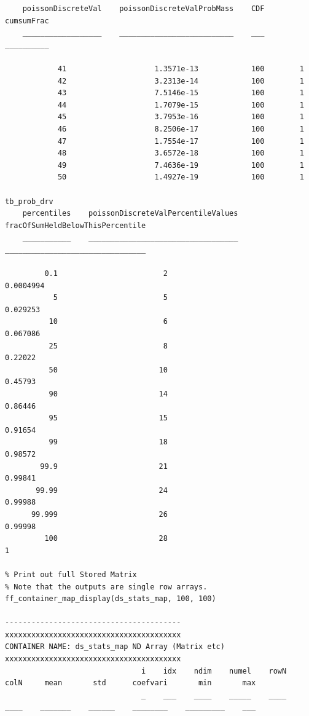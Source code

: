 \documentclass[
]{book}
\begin{document}
\begin{verbatim}
    poissonDiscreteVal    poissonDiscreteValProbMass    CDF    cumsumFrac
    __________________    __________________________    ___    __________

            41                    1.3571e-13            100        1     
            42                    3.2313e-14            100        1     
            43                    7.5146e-15            100        1     
            44                    1.7079e-15            100        1     
            45                    3.7953e-16            100        1     
            46                    8.2506e-17            100        1     
            47                    1.7554e-17            100        1     
            48                    3.6572e-18            100        1     
            49                    7.4636e-19            100        1     
            50                    1.4927e-19            100        1     

tb_prob_drv
    percentiles    poissonDiscreteValPercentileValues    fracOfSumHeldBelowThisPercentile
    ___________    __________________________________    ________________________________

         0.1                        2                               0.0004994            
           5                        5                                0.029253            
          10                        6                                0.067086            
          25                        8                                 0.22022            
          50                       10                                 0.45793            
          90                       14                                 0.86446            
          95                       15                                 0.91654            
          99                       18                                 0.98572            
        99.9                       21                                 0.99841            
       99.99                       24                                 0.99988            
      99.999                       26                                 0.99998            
         100                       28                                       1            

% Print out full Stored Matrix
% Note that the outputs are single row arrays.
ff_container_map_display(ds_stats_map, 100, 100)

----------------------------------------
xxxxxxxxxxxxxxxxxxxxxxxxxxxxxxxxxxxxxxxx
CONTAINER NAME: ds_stats_map ND Array (Matrix etc)
xxxxxxxxxxxxxxxxxxxxxxxxxxxxxxxxxxxxxxxx
                               i    idx    ndim    numel    rowN    colN     mean       std      coefvari       min       max
                               _    ___    ____    _____    ____    ____    _______    ______    ________    _________    ___


\end{verbatim}
\end{document}
